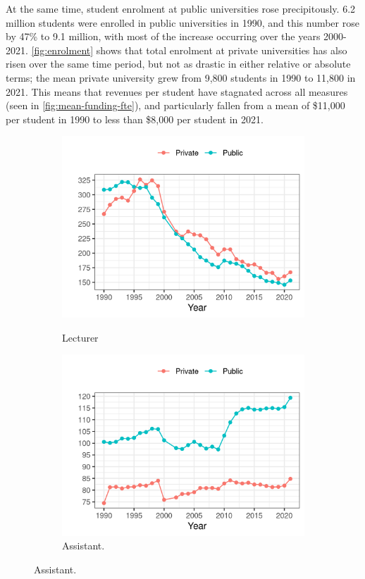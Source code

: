 At the same time, student enrolment at public universities rose precipitously.
6.2 million students were enrolled in public universities in 1990, and this number rose by 47\% to 9.1 million, with most of the increase occurring over the years 2000-2021.
\autoref{fig:enrolment} shows that total enrolment at private universities has also risen over the same time period, but not as drastic in either relative or absolute terms; the mean private university grew from 9,800 students in 1990 to 11,800 in 2021.
This means that revenues per student have stagnated across all measures (seen in \autoref{fig:mean-funding-fte}), and particularly fallen from a mean of \$11,000 per student in 1990 to less than \$8,000 per student in 2021.

\begin{figure}[h!]
    \centering
    \singlespacing
    \caption{Student Enrollment per Professor, by University Sector, Professor Appointment, and Year.}
    \begin{subfigure}[b]{0.495\textwidth}
        \centering
        \caption{Lecturer}
        \includegraphics[width=\textwidth]{figures/lecturer-fte-perprof.png}
        \label{fig:lecturer-fte-perprof}
    \end{subfigure}
    \begin{subfigure}[b]{0.495\textwidth}
        \centering
        \caption{Assistant.}
        \includegraphics[width=\textwidth]{figures/assistant-fte-perprof.png}

\end{subfigure}
\end{figure}
